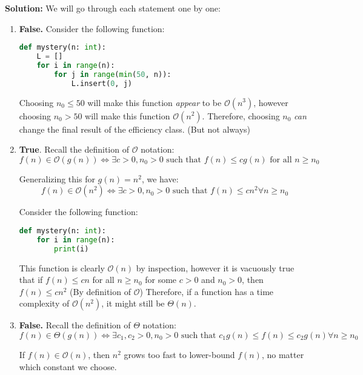 \documentclass{article}
\begin{document}
\textbf{Solution:}
We will go through each statement one by one:

\begin{enumerate}
    \item \textbf{False.} Consider the following function:
    \begin{lstlisting}[language=Python, style=mystyle]
def mystery(n: int):
    L = []
    for i in range(n):
        for j in range(min(50, n)):
            L.insert(0, j)
\end{lstlisting}
Choosing $n_0 \leq 50$ will make this function \textit{appear} to be $\mathcal{O}(n^3)$, however choosing $n_0 > 50$ will make this function $\mathcal{O}(n^2)$. Therefore, choosing $n_0$ \textit{can} change the final result of the efficiency class. (But not always)

\item \textbf{True}. Recall the definition of $\mathcal{O}$ notation:
\begin{equation}
    f(n) \in \mathcal{O}(g(n)) \iff \exists c > 0, n_0 > 0 \text{ such that } f(n) \leq cg(n) \text{ for all } n \geq n_0
\end{equation}

Generalizing this for $g(n) = n^2$, we have:
\begin{equation}
    f(n) \in \mathcal{O}(n^2) \iff \exists c > 0, n_0 > 0 \text{ such that } f(n) \leq cn^2 \forall n \geq n_0
\end{equation}

Consider the following function:
\begin{lstlisting}[language=Python, style=mystyle]
def mystery(n: int):
    for i in range(n):
        print(i)
\end{lstlisting}

This function is clearly $\mathcal{O}(n)$ by inspection, however it is vacuously true that if $f(n) \leq cn$ for all $n \geq n_0$ for some $c > 0$ and $n_0 > 0$, then $f(n) \leq cn^2$ (By definition of $\mathcal{O}$) Therefore, if a function has a time complexity of $\mathcal{O}(n^2)$, it might still be $\Theta(n)$.

\item \textbf{False.} Recall the definition of $\Theta$ notation:
\begin{equation}
    f(n) \in \Theta(g(n)) \iff \exists c_1, c_2 > 0, n_0 > 0 \text{ such that } c_1g(n) \leq f(n) \leq c_2g(n) \forall n \geq n_0
\end{equation}

If $f(n) \in \mathcal{O}(n)$, then $n^2$ grows too fast to lower-bound $f(n)$, no matter which constant we choose.


\end{enumerate}
\end{document}
